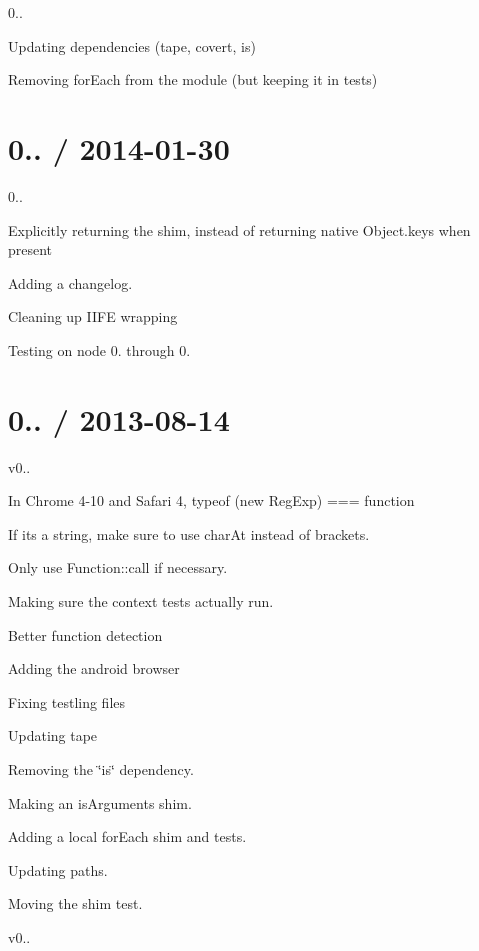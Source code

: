 \begin{DoxyItemize}
\item 0..
\item Updating dependencies (tape, covert, is)
\item Removing for\+Each from the module (but keeping it in tests)
\end{DoxyItemize}

\section*{0.. / 2014-\/01-\/30 }


\begin{DoxyItemize}
\item 0..
\item Explicitly returning the shim, instead of returning native Object.\+keys when present
\item Adding a changelog.
\item Cleaning up I\+I\+FE wrapping
\item Testing on node 0. through 0.
\end{DoxyItemize}

\section*{0.. / 2013-\/08-\/14 }


\begin{DoxyItemize}
\item v0..
\item In Chrome 4-\/10 and Safari 4, typeof (new Reg\+Exp) === \textquotesingle{}function\textquotesingle{}
\item If it\textquotesingle{}s a string, make sure to use char\+At instead of brackets.
\item Only use Function\+::call if necessary.
\item Making sure the context tests actually run.
\item Better function detection
\item Adding the android browser
\item Fixing testling files
\item Updating tape
\item Removing the \char`\"{}is\char`\"{} dependency.
\item Making an is\+Arguments shim.
\item Adding a local for\+Each shim and tests.
\item Updating paths.
\item Moving the shim test.
\item v0..
\end{DoxyItemize}

